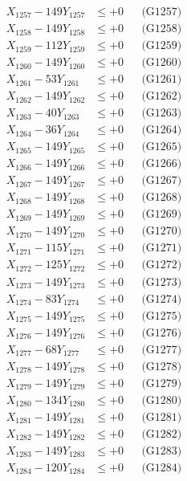\documentclass[a4paper,10pt]{article}
\begin{document}
{\begin{align}
X_{1257} - 149Y_{1257} &\leq +0 && \text{(G1257)} \\
X_{1258} - 149Y_{1258} &\leq +0 && \text{(G1258)} \\
X_{1259} - 112Y_{1259} &\leq +0 && \text{(G1259)} \\
X_{1260} - 149Y_{1260} &\leq +0 && \text{(G1260)} \\
\allowbreak
X_{1261} - 53Y_{1261} &\leq +0 && \text{(G1261)} \\
X_{1262} - 149Y_{1262} &\leq +0 && \text{(G1262)} \\
X_{1263} - 40Y_{1263} &\leq +0 && \text{(G1263)} \\
X_{1264} - 36Y_{1264} &\leq +0 && \text{(G1264)} \\
X_{1265} - 149Y_{1265} &\leq +0 && \text{(G1265)} \\
X_{1266} - 149Y_{1266} &\leq +0 && \text{(G1266)} \\
X_{1267} - 149Y_{1267} &\leq +0 && \text{(G1267)} \\
X_{1268} - 149Y_{1268} &\leq +0 && \text{(G1268)} \\
X_{1269} - 149Y_{1269} &\leq +0 && \text{(G1269)} \\
X_{1270} - 149Y_{1270} &\leq +0 && \text{(G1270)} \\
\allowbreak
X_{1271} - 115Y_{1271} &\leq +0 && \text{(G1271)} \\
X_{1272} - 125Y_{1272} &\leq +0 && \text{(G1272)} \\
X_{1273} - 149Y_{1273} &\leq +0 && \text{(G1273)} \\
X_{1274} - 83Y_{1274} &\leq +0 && \text{(G1274)} \\
X_{1275} - 149Y_{1275} &\leq +0 && \text{(G1275)} \\
X_{1276} - 149Y_{1276} &\leq +0 && \text{(G1276)} \\
X_{1277} - 68Y_{1277} &\leq +0 && \text{(G1277)} \\
X_{1278} - 149Y_{1278} &\leq +0 && \text{(G1278)} \\
X_{1279} - 149Y_{1279} &\leq +0 && \text{(G1279)} \\
X_{1280} - 134Y_{1280} &\leq +0 && \text{(G1280)} \\
\allowbreak
X_{1281} - 149Y_{1281} &\leq +0 && \text{(G1281)} \\
X_{1282} - 149Y_{1282} &\leq +0 && \text{(G1282)} \\
X_{1283} - 149Y_{1283} &\leq +0 && \text{(G1283)} \\
X_{1284} - 120Y_{1284} &\leq +0 && \text{(G1284)} \\

\end{align}}
\end{document}
